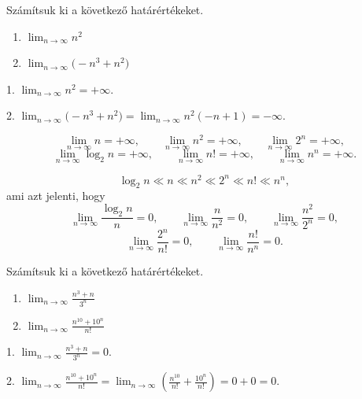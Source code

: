 \documentclass[11pt]{article}
\begin{document}
\begin{exbox}
\begin{example}
Számítsuk ki a következő határértékeket.
\begin{enumerate}[label=\arabic*., itemsep=6pt]
\item $\displaystyle\lim_{n\to\infty}n^{2}$
\item $\displaystyle\lim_{n\to\infty}\bigl(-n^{3}+n^{2}\bigr)$
\end{enumerate}
\end{example}
\end{exbox}
\begin{solution}
1. $\displaystyle\lim_{n\to\infty}n^{2}=+\infty$.

2. $\displaystyle\lim_{n\to\infty}\bigl(-n^{3}+n^{2}\bigr)=\lim_{n\to\infty}n^{2}(-n+1)=-\infty$.
\end{solution}

\begin{thmbox}
\begin{theorem}
\[
\lim_{n\to\infty}n=+\infty,\qquad
\lim_{n\to\infty}n^{2}=+\infty,\qquad
\lim_{n\to\infty}2^{n}=+\infty,
\]
\[
\lim_{n\to\infty}\log_{2}n=+\infty,\qquad
\lim_{n\to\infty}n!=+\infty,\qquad
\lim_{n\to\infty}n^{n}=+\infty .
\]
\end{theorem}
\end{thmbox}

\begin{thmbox}
\begin{theorem}[Erősorrend]
\[
\log_{2}n\ll n\ll n^{2}\ll 2^{n}\ll n!\ll n^{n},
\]
ami azt jelenti, hogy
\[
\lim_{n\to\infty}\frac{\log_{2}n}{n}=0,\qquad
\lim_{n\to\infty}\frac{n}{n^{2}}=0,\qquad
\lim_{n\to\infty}\frac{n^{2}}{2^{n}}=0,
\]
\[
\lim_{n\to\infty}\frac{2^{n}}{n!}=0,\qquad
\lim_{n\to\infty}\frac{n!}{n^{n}}=0 .
\]
\end{theorem}
\end{thmbox}

\begin{exbox}
\begin{example}
Számítsuk ki a következő határértékeket.
\begin{enumerate}[label=\arabic*., itemsep=6pt]
\item $\displaystyle\lim_{n\to\infty}\frac{n^{3}+n}{3^{n}}$
\item $\displaystyle\lim_{n\to\infty}\frac{n^{10}+10^{n}}{n!}$
\end{enumerate}
\end{example}
\end{exbox}
\begin{solution}
1. $\displaystyle\lim_{n\to\infty}\frac{n^{3}+n}{3^{n}}=0$.

2. $\displaystyle\lim_{n\to\infty}\frac{n^{10}+10^{n}}{n!}
=\lim_{n\to\infty}\left(\frac{n^{10}}{n!}+\frac{10^{n}}{n!}\right)=0+0=0$.
\end{solution}
\end{document}
